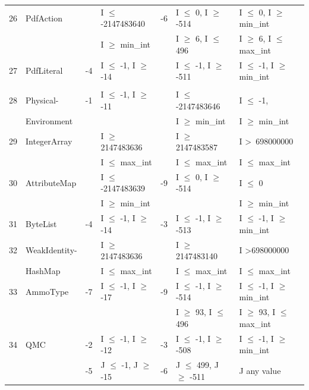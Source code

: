 {\begin{longtable}{|l|l|l|l|l|l|l|}
\hline



26	& PdfAction					&& I $\le$ -2147483640 			&-6 & I $\le$ 0, I $\ge$ -514			& I $\le$ 0, I $\ge$ min\_int 	\\ 
	&                                             && I $\ge$ min\_int				&& I $\ge$ 6, I $\le$ 496			& I $\ge$ 6,  I $\le$ max\_int	\\	
	\hline
27	& PdfLiteral					&-4& I $\le$ -1, I $\ge$ -14		&& I $\le$ -1, I $\ge$ -511			& I $\le$ -1, I $\ge$ min\_int	\\ 
	&							&&								&&								&									\\




	\hline
28	& Physical-					&-1 & I $\le$ -1, I $\ge$ -11		&	& I $\le$ -2147483646			& I $\le$ -1, 							\\ 
	& Environment				&& 								&& I $\ge$ min\_int	 			& I $\ge$ min\_int				\\ 
	\hline
29	& IntegerArray				&& I $\ge$ 2147483636			&& I $\ge$ 2147483587			& I \textgreater~698000000					\\ 
	&                                             && I $\le$ max\_int				&& I $\le$ max\_int				&  I $\le$ max\_int				\\	
	\hline
30	& AttributeMap				&& I $\le$ -2147483639			&-9 & I $\le$ 0, I $\ge$ -514			& I $\le$ 0								\\ 
	&                                             && I $\ge$ min\_int				&& 								& I $\ge$ min\_int 			   	\\	
	\hline
31	& ByteList					&-4 & I $\le$ -1, I $\ge$ -14		&-3 & I $\le$ -1, I $\ge$ -513			& I $\le$ -1, I $\ge$ min\_int	\\ 
	\hline
32	& WeakIdentity-				&& I $\ge$ 2147483636			&& I $\ge$ 2147483140			& I \textgreater 698000000					\\ 
	& HashMap                              && I $\le$ max\_int				&& I $\le$ max\_int				& I $\le$ max\_int					\\
	\hline
33	& AmmoType				&-7 & I $\le$ -1, I $\ge$ -17		&-9 & I $\le$ -1, I $\ge$ -514			& I $\le$ -1, I $\ge$ min\_int	\\ 			
	&                                             && 								&& I $\ge$ 93, I $\le$ 496			& I $\ge$ 93, 	I $\le$ max\_int	\\
	\hline
34	& QMC						&-2 & I $\le$ -1, I $\ge$ -12		&-3 & I $\le$ -1, I $\ge$ -508			& I $\le$ -1, I $\ge$ min\_int	\\ 
	&                                             &-5 & J $\le$ -1, J $\ge$ -15		&-6 & J $\le$ 499, J $\ge$ -511		& J any value			 		  				\\	

\end{longtable}}
